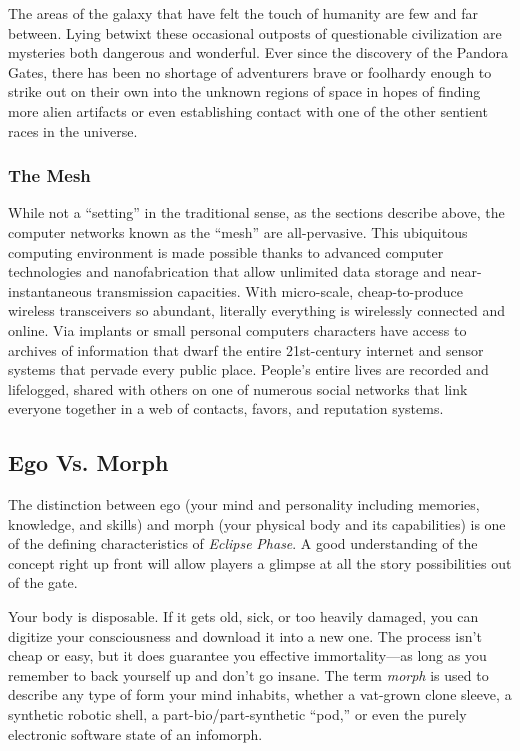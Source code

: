 The areas of the galaxy that have felt the touch of 
humanity are few and far between. Lying betwixt 
these occasional outposts of questionable civilization 
are mysteries both dangerous and wonderful. Ever 
since the discovery of the Pandora Gates, there has 
been no shortage of adventurers brave or foolhardy 
enough to strike out on their own into the unknown 
regions of space in hopes of finding more alien artifacts
or even establishing contact with one of the
other sentient races in the universe.

\subsubsection{The Mesh}

While not a ``setting'' in the traditional sense, as 
the sections describe above, the computer networks
known as the ``mesh'' are all-pervasive. This
ubiquitous computing environment is made possible
thanks to advanced computer technologies and
nanofabrication that allow unlimited data storage 
and near-instantaneous transmission capacities. With 
micro-scale, cheap-to-produce wireless transceivers so 
abundant, literally everything is wirelessly connected 
and online. Via implants or small personal computers
characters have access to archives of information
that dwarf the entire 21st-century internet and sensor 
systems that pervade every public place. People's 
entire lives are recorded and lifelogged, shared with 
others on one of numerous social networks that link 
everyone together in a web of contacts, favors, and 
reputation systems.

\subsection{Ego Vs. Morph}

The distinction between ego (your mind and personality
including memories, knowledge, and skills)
and morph (your physical body and its capabilities) 
is one of the defining characteristics of \textit{Eclipse }
\textit{Phase}. A good understanding of the concept right 
up front will allow players a glimpse at all the story 
possibilities out of the gate.

Your body is disposable. If it gets old, sick, or too 
heavily damaged, you can digitize your consciousness
and download it into a new one. The process
isn't cheap or easy, but it does guarantee you effective
immortality—as long as you remember to
back yourself up and don't go insane. The term 
\textit{morph }is used to describe any type of form your 
mind inhabits, whether a vat-grown clone sleeve, 
a synthetic robotic shell, a part-bio/part-synthetic 
``pod,'' or even the purely electronic software state 
of an infomorph.


